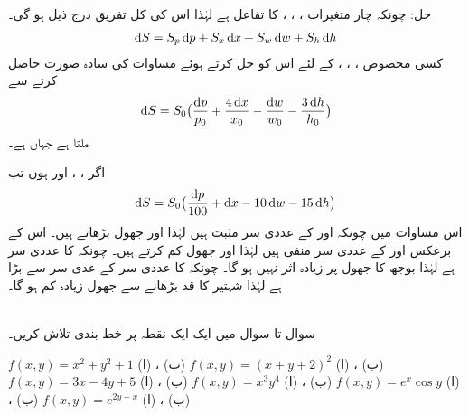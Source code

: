 حل:\quad
چونکہ  چار متغیرات ، ، ،  کا تفاعل ہے لہٰذا اس  کی  کل تفریق  درج ذیل ہو گی۔
\begin{align*}
\dif S=S_p\dif p+S_x\dif x+S_w\dif w+S_h\dif h
\end{align*}
کسی مخصوص ، ، ،  کے لئے اس کو حل کرتے ہوئے  مساوات کی سادہ صورت حاصل کرنے سے  
\begin{align*}
\dif S=S_0\big(\frac{\dif p}{p_0}+\frac{4\dif x}{x_0}-\frac{\dif w}{w_0}-\frac{3\dif h}{h_0}\big)
\end{align*}
ملتا ہے جہاں  ہے۔

اگر ، ،  اور  ہوں تب
\begin{align}
\dif S=S_0\big(\frac{\dif p}{100}+\dif x-10\dif w-15\dif h\big)
\end{align}
اس مساوات میں چونکہ  اور  کے عددی سر  مثبت ہیں لہٰذا  اور  جھول بڑھاتے ہیں۔ اس کے برعکس  اور  کے عددی سر  منفی ہیں لہٰذا  اور  جھول کم کرتے ہیں۔ چونکہ  کا عددی سر  ہے لہٰذا بوجھ کا جھول پر زیادہ اثر نہیں ہو گا۔ چونکہ  کا عددی سر  کے عدی سر سے بڑا ہے لہٰذا  شہتیر کا قد  بڑھانے سے جھول زیادہ کم ہو گا۔

\\
سوال  تا سوال  میں ایک ایک نقطہ پر خط  بندی  تلاش کریں۔

$f(x,y)=x^2+y^2+1$\quad
(ا) ، (ب) 
$f(x,y)=(x+y+2)^2$\quad
(ا) ، (ب) 
$f(x,y)=3x-4y+5$\quad
(ا) ، (ب) 
$f(x,y)=x^3y^4$\quad
(ا) ، (ب) 
$f(x,y)=e^x\cos y$\quad
(ا) ، (ب) 
$f(x,y)=e^{2y-x}$\quad
(ا) ، (ب) 

